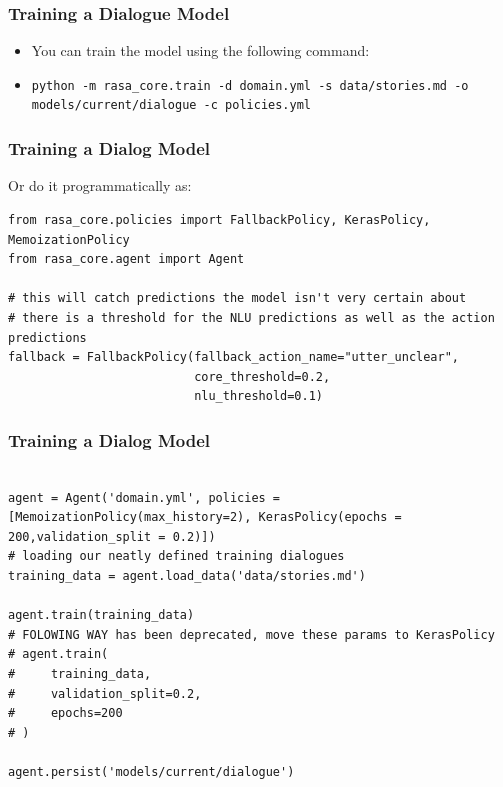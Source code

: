  \begin{frame}[fragile]\frametitle{Training a Dialogue Model}


\begin{itemize}
\item You can train the model using the following command:

\item \lstinline|python -m rasa_core.train -d domain.yml -s data/stories.md -o models/current/dialogue -c policies.yml|
\end{itemize}

\end{frame}

 \begin{frame}[fragile]\frametitle{Training a Dialog Model}

Or do it programmatically as:

\begin{lstlisting}
from rasa_core.policies import FallbackPolicy, KerasPolicy, MemoizationPolicy
from rasa_core.agent import Agent

# this will catch predictions the model isn't very certain about
# there is a threshold for the NLU predictions as well as the action predictions
fallback = FallbackPolicy(fallback_action_name="utter_unclear",
                          core_threshold=0.2,
                          nlu_threshold=0.1)

\end{lstlisting}

\end{frame}

 \begin{frame}[fragile]\frametitle{Training a Dialog Model}

\begin{lstlisting}

agent = Agent('domain.yml', policies = [MemoizationPolicy(max_history=2), KerasPolicy(epochs = 200,validation_split = 0.2)])
# loading our neatly defined training dialogues
training_data = agent.load_data('data/stories.md')

agent.train(training_data)
# FOLOWING WAY has been deprecated, move these params to KerasPolicy
# agent.train(
#     training_data,
#     validation_split=0.2,
#     epochs=200
# )

agent.persist('models/current/dialogue')
\end{lstlisting}

\end{frame}

